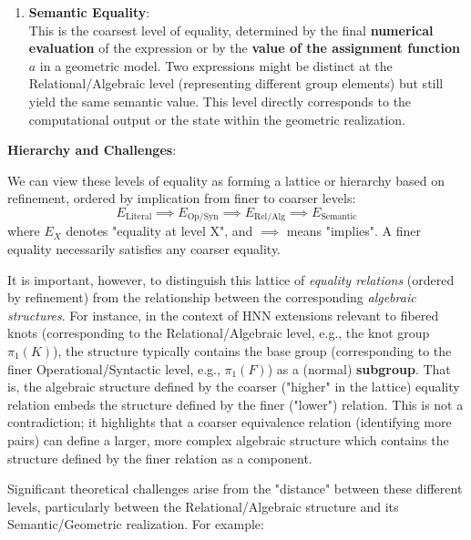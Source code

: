 \begin{enumerate}
    \item \textbf{Semantic Equality}: \\
    This is the coarsest level of equality, determined by the final \textbf{numerical evaluation} of the expression or by the \textbf{value of the assignment function $a$} in a geometric model. Two expressions might be distinct at the Relational/Algebraic level (representing different group elements) but still yield the same semantic value. This level directly corresponds to the computational output or the state within the geometric realization.
\end{enumerate}

\textbf{Hierarchy and Challenges}:

We can view these levels of equality as forming a lattice or hierarchy based on refinement, ordered by implication from finer to coarser levels:
$$ E_{\text{Literal}} \implies E_{\text{Op/Syn}} \implies E_{\text{Rel/Alg}} \implies E_{\text{Semantic}} $$
where $E_X$ denotes "equality at level X", and $\implies$ means "implies". A finer equality necessarily satisfies any coarser equality.

It is important, however, to distinguish this lattice of \emph{equality relations} (ordered by refinement) from the relationship between the corresponding \emph{algebraic structures}. For instance, in the context of HNN extensions relevant to fibered knots (corresponding to the Relational/Algebraic level, e.g., the knot group $\pi_1(K)$), the structure typically contains the base group (corresponding to the finer Operational/Syntactic level, e.g., $\pi_1(F)$) as a (normal) \textbf{subgroup}. That is, the algebraic structure defined by the coarser ("higher" in the lattice) equality relation embeds the structure defined by the finer ("lower") relation. This is not a contradiction; it highlights that a coarser equivalence relation (identifying more pairs) can define a larger, more complex algebraic structure which contains the structure defined by the finer relation as a component.

Significant theoretical challenges arise from the "distance" between these different levels, particularly between the Relational/Algebraic structure and its Semantic/Geometric realization. For example:

